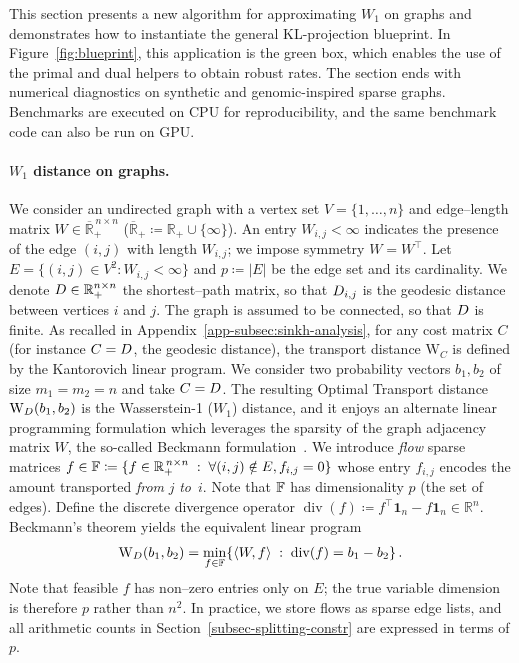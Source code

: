 \documentclass{article}
\newcommand{\dotp}[2]{\langle #1,#2 \rangle}
\theoremstyle{plain}
\newcommand{\Vertex}{V}
\newcommand{\Edge}{E}
\newcommand{\length}{W}
\newcommand{\eqdef}{\coloneqq}
\DeclareMathOperator{\diverg}{div}
\newcommand{\RR}{\mathbb{R}}
\begin{document}
This section presents a new algorithm for approximating $W_1$ on graphs and demonstrates how to instantiate the general KL-projection blueprint. In Figure~\ref{fig:blueprint}, this application is the green box, which enables the use of the primal and dual helpers to obtain robust rates. The section ends with numerical diagnostics on synthetic and genomic-inspired sparse graphs. Benchmarks are executed on CPU for reproducibility, and the same benchmark code can also be run on GPU.


\paragraph{$W_{1}$ distance on graphs.}
\label{subsec-w1-graphs}


We consider an undirected graph with a vertex set 
$\Vertex=\{1,\dots,n\}$ and edge--length matrix 
$\length\in\overline{\RR}_{+}^{\,n\times n}$ 
($\overline{\RR}_{+}\eqdef\RR_{+}\cup\{\infty\}$).  
An entry $\length_{i,j}<\infty$ indicates the presence of the edge $(i,j)$ with length $\length_{i,j}$; we impose symmetry $\length=\length^{\!\top}$. Let $\Edge = \{(i,j)\in\Vertex^{2}:\length_{i,j}<\infty\}$ and $p \eqdef |\Edge|$ be the edge set and its cardinality.  
%
We denote $\Geod \in\RR_{+}^{n\times n}$ the shortest--path matrix, so that $D_{i,j}$ is the geodesic distance between vertices $i$ and $j$.
%
The graph is assumed to be connected, so that $D$ is finite. 
%
As recalled in Appendix~\ref{app-subsec:sinkh-analysis}, for any cost matrix $C$ (for instance $C=D$, the geodesic distance), the transport distance $\mathrm W_C$ is defined by the Kantorovich linear program. We consider two probability vectors $b_1,b_2$ of size $m_1=m_2=n$ and take $C=D$. The resulting Optimal Transport distance $\mathrm W_{D}(b_1,b_2)$ is the Wasserstein-1 ($W_1$) distance, and it enjoys an alternate linear programming formulation which leverages the sparsity of the graph adjacency matrix $W$, the so-called Beckmann formulation~\citep{Beckmann52,santambrogio2015optimal}.
%
We introduce \emph{flow} sparse matrices $f\in\Flows\eqdef \{ f \in \RR_{+}^{\,n\times n} \;:\; \forall (i,j) \notin \Edge, f_{i,j}=0 \}$ whose entry $f_{i,j}$ encodes the amount transported \emph{from} $j$ \emph{to}~$i$. Note that $\mathbb{F}$ has dimensionality $p$ (the set of edges). 
%
%
Define the discrete divergence operator $\diverg(f) \eqdef f^{\top}\mathbf 1_{n}-f\mathbf 1_{n}\in\RR^{n}$.
Beckmann’s theorem yields the equivalent linear program 
\begin{equation}
	\label{eq-W1-flow}
	\mathrm W_{\Geod}(b_1,b_2)
	=
	\min_{f\in\Flows} \{ \dotp{\length}{f} \;:\; \diverg(f)=b_1-b_2\}\,.
\end{equation}
Note that feasible $f$ has non--zero entries only on $\Edge$; the true variable dimension is therefore $p$ rather than $n^{2}$.  
In practice, we store flows as sparse edge lists, and all arithmetic counts in Section~\ref{subsec-splitting-constr} are expressed in terms of $p$.
\end{document}
